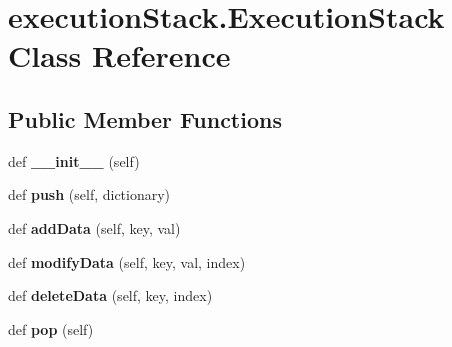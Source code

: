 \hypertarget{classexecution_stack_1_1_execution_stack}{}\section{execution\+Stack.\+Execution\+Stack Class Reference}
\label{classexecution_stack_1_1_execution_stack}
\subsection*{Public Member Functions}
\begin{DoxyCompactItemize}
\item 
def {\bfseries \+\_\+\+\_\+init\+\_\+\+\_\+} (self)\hypertarget{classexecution_stack_1_1_execution_stack_a955ae5d9778e86b1c0325a0873fad686}{}\label{classexecution_stack_1_1_execution_stack_a955ae5d9778e86b1c0325a0873fad686}

\item 
def {\bfseries push} (self, dictionary)\hypertarget{classexecution_stack_1_1_execution_stack_a228350aa77b6029b1aafdcd34612ce61}{}\label{classexecution_stack_1_1_execution_stack_a228350aa77b6029b1aafdcd34612ce61}

\item 
def {\bfseries add\+Data} (self, key, val)\hypertarget{classexecution_stack_1_1_execution_stack_a7df2cbd7895c11c301631b45d7d24e1b}{}\label{classexecution_stack_1_1_execution_stack_a7df2cbd7895c11c301631b45d7d24e1b}

\item 
def {\bfseries modify\+Data} (self, key, val, index)\hypertarget{classexecution_stack_1_1_execution_stack_ab1bcc59b2d0f26c0178f7c457efce474}{}\label{classexecution_stack_1_1_execution_stack_ab1bcc59b2d0f26c0178f7c457efce474}

\item 
def {\bfseries delete\+Data} (self, key, index)\hypertarget{classexecution_stack_1_1_execution_stack_aaa0f483291031cc81423a4525838f8d0}{}\label{classexecution_stack_1_1_execution_stack_aaa0f483291031cc81423a4525838f8d0}

\item 
def {\bfseries pop} (self)\hypertarget{classexecution_stack_1_1_execution_stack_aec0e4c8c421162e42668372c1309e6c5}{}\label{classexecution_stack_1_1_execution_stack_aec0e4c8c421162e42668372c1309e6c5}

\end{DoxyCompactItemize}

